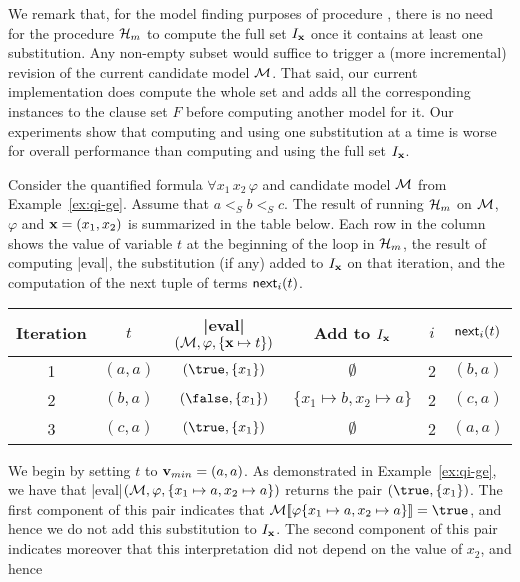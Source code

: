 \documentclass{svjour3}                     %
\begin{document}
We remark that, for the model finding purposes of procedure \fmsolve,
there is no need for the procedure $\mathcal{H}_{m}$ to compute 
the full set $I_{\mathbf{x}}$ once it contains at least one substitution.
Any non-empty subset would suffice to trigger a (more incremental) 
revision of the current candidate model $\mathcal{M}$.
That said, our current implementation does compute the whole set and adds all 
the corresponding instances to the clause set $F$ before computing another model for it.
Our experiments show that computing and using one substitution at a time
is worse for overall performance than computing and using
the full set $I_{\mathbf{x}}$.

\begin{example}
Consider the quantified formula $\forall x_1\, x_2\, \varphi$ and candidate model $\mathcal{M}$ from Example~\ref{ex:qi-ge}.
Assume that $a <_S b <_S c$.
The result of running $\mathcal{H}_m$ on $\mathcal{M}$, $\varphi$ and $\mathbf{x} = ( x_1, x_2 )$ is summarized in the table below.
Each row in the column shows the value of variable $t$ at the beginning of the loop in $\mathcal{H}_m$,
the result of computing |eval|, the substitution (if any) added to $I_{\mathbf{x}}$ on that iteration,
and the computation of the next tuple of terms $\mathsf{next}_{i}(t)$.
\begin{center}
\begin{tabular}{|@{\ }c@{\ }|@{\ }c@{\ }|@{\ }c@{\ }|@{\ }c@{\ }|@{\ }c@{\ }|@{\;}c|}
\hline
Iteration & $t$ & |eval|$( \mathcal{M}, \varphi, \{ \mathbf{x} \mapsto t \})$ & Add to $I_{\mathbf{x}}$ & $i$ & $\mathsf{next}_{i}(t)$
\\
\hline
1 & $(a,a)$ & $(\true, \{ x_1 \} )$ & $\emptyset$ & 2 & $(b,a)$ \\
2 & $(b,a)$ & $(\false, \{ x_1 \} )$ & $\{ x_1 \mapsto b, x_2 \mapsto a \}$ & 2 & $(c,a)$ \\
3 & $(c,a)$ & $(\true, \{ x_1 \} )$ & $\emptyset$ & 2 & $(a,a)$ \\
\hline
\end{tabular}
\end{center}
We begin by setting $t$ to ${\mathbf{v}}_{min} = (a,a)$.
As demonstrated in Example~\ref{ex:qi-ge}, 
we have that |eval|$( \mathcal{M}, \varphi, \{ x_1 \mapsto a, x_2 \mapsto a \})$ returns the pair $(\true, \{ x_1 \} )$.
The first component of this pair 
indicates that $\evaluate{\varphi \{ x_1 \mapsto a, x_2 \mapsto a \}}{\M} = \true$,
and hence we do not add this substitution to $I_{\mathbf{x}}$.
The second component of this pair indicates moreover that
this interpretation did not depend on the value of $x_2$, and hence

\end{example}
\end{document}
